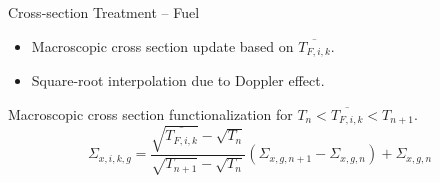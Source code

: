 \begin{frame}{Cross-section Treatment -- Fuel}
  \begin{itemize}
    \item Macroscopic cross section update based on $\overline{T_{F,i,k}}$.
    \item Square-root interpolation due to Doppler effect.
  \end{itemize}

  Macroscopic cross section functionalization for ${T_n < \overline{T_{F,i,k}} <
  T_{n+1}}$.
  \begin{equation}
    \Sigma_{x,i,k,g} = 
      \frac{\sqrt{\overline{T_{F,i,k}}} - \sqrt{T_{n}}}
      {\sqrt{T_{n+1}}-\sqrt{T_{n}}}
      (\Sigma_{x,g,n+1} - \Sigma_{x,g,n})  + \Sigma_{x,g,n}
  \end{equation}
\end{frame}
